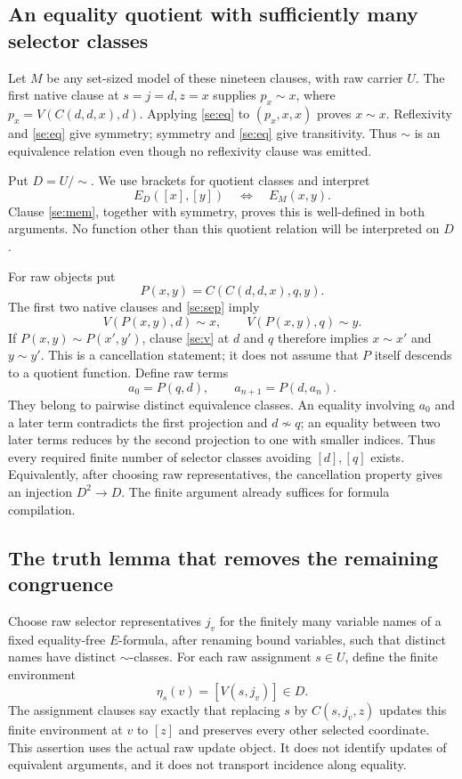 \subsection{An equality quotient with sufficiently many selector classes}

Let $M$ be any set-sized model of these nineteen clauses, with raw carrier
$U$. The first native clause at $s=j=d,z=x$ supplies
$p_x\sim x$, where $p_x=V(C(d,d,x),d)$. Applying \eqref{se:eq} to
$(p_x,x,x)$ proves $x\sim x$. Reflexivity and \eqref{se:eq} give symmetry;
symmetry and \eqref{se:eq} give transitivity. Thus $\sim$ is an
equivalence relation even though no reflexivity clause was emitted.

Put $D=U/{\sim}$. We use brackets for quotient classes and interpret
\[
 E_D([x],[y])\quad\Longleftrightarrow\quad E_M(x,y).
\]
Clause \eqref{se:mem}, together with symmetry, proves this is well-defined
in both arguments. No function other than this quotient relation will
be interpreted on $D$.

For raw objects put
\[
 P(x,y)=C(C(d,d,x),q,y).
\]
The first two native clauses and \eqref{se:sep} imply
\[
 V(P(x,y),d)\sim x,\qquad V(P(x,y),q)\sim y.
\]
If $P(x,y)\sim P(x',y')$, clause \eqref{se:v} at $d$ and $q$
therefore implies $x\sim x'$ and $y\sim y'$. This is a cancellation
statement; it does not assume that $P$ itself descends to a quotient
function. Define raw terms
\[
 a_0=P(q,d),\qquad a_{n+1}=P(d,a_n).
\]
They belong to pairwise distinct equivalence classes. An equality involving
$a_0$ and a later term contradicts the first projection and $d\not\sim q$;
an equality between two later terms reduces by the second projection to
one with smaller indices. Thus every required finite number of selector
classes avoiding $[d],[q]$ exists. Equivalently, after choosing raw
representatives, the cancellation property gives an injection $D^2\to D$.
The finite argument already suffices for formula compilation.

\subsection{The truth lemma that removes the remaining congruence}

Choose raw selector representatives $j_v$ for the finitely many variable
names of a fixed equality-free $E$-formula, after renaming bound variables,
such that distinct names have distinct $\sim$-classes. For each raw
assignment $s\in U$, define the finite environment
\[
 \eta_s(v)=[V(s,j_v)]\in D.
\]
The assignment clauses say exactly that replacing $s$ by
$C(s,j_v,z)$ updates this finite environment at $v$ to $[z]$ and
preserves every other selected coordinate. This assertion uses the
actual raw update object. It does not identify updates of equivalent
arguments, and it does not transport incidence along equality.

